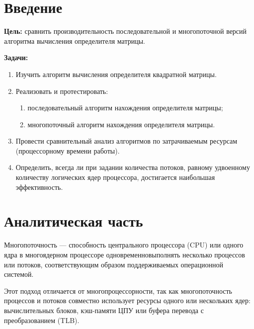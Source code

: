 \documentclass[a4paper,oneside,14pt]{extreport}
\begin{document}

\newpage
\tableofcontents
{}

\newpage

\chapter*{Введение}
\textbf{Цель:} сравнить производительность последовательной и многопоточной версий алгоритма вычисления определителя матрицы.

\textbf{Задачи:}
\begin{enumerate}
	\item Изучить алгоритм вычисления определителя квадратной матрицы.
	\item Реализовать и протестировать:
	\begin{enumerate}
		\item последовательный алгоритм нахождения определителя матрицы;
		\item многопоточный алгоритм нахождения определителя матрицы.
	\end{enumerate}
	\item Провести сравнительный анализ алгоритмов по затрачиваемым ресурсам (процессорному времени работы).
	\item Определить, всегда ли при задании количества потоков, равному удвоенному количеству логических ядер процессора, достигается наибольшая эффективность.
\end{enumerate}
\newpage

\chapter{Аналитическая часть}
 Многопоточность — способность центрального процессора (CPU) или одного ядра
в многоядерном процессоре одновременновыполнять несколько процессов или
потоков, соответствующим образом поддерживаемых операционной системой.

Этот подход отличается от многопроцессорности, так как многопоточность
процессов и потоков совместно использует ресурсы одного или нескольких ядер:
вычислительных блоков, кэш-памяти ЦПУ или буфера перевода с преобразованием (TLB).
\end{document}
